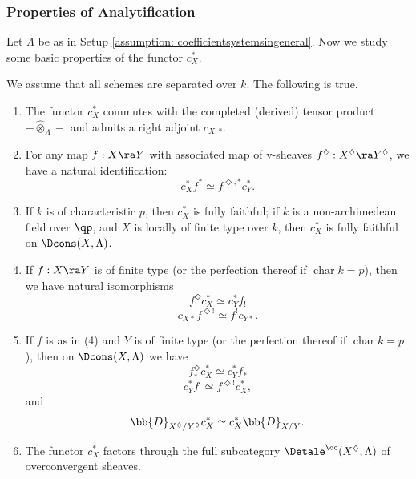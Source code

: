 \documentclass[letterpaper,11pt]{amsart}
\begin{document}
\subsubsection{Properties of Analytification}
Let $\Lambda$ be as in Setup \ref{assumption: coefficientsystemsingeneral}. Now we study some basic properties of the functor $c_X^\ast$. 

\begin{proposition}{\label{prop: propertiesofthealgebraizationfunctor}}
We assume that all schemes are separated over $k$. The following is true.
\begin{enumerate}
\item The functor $c_{X}^\ast$ commutes with the completed (derived) tensor product $-\hat{\otimes}_\Lambda-$ and admits a right adjoint $c_{X,\ast}$. 
\item For any map $f: X \ra Y$ with associated map of v-sheaves $f^{\Diamond}: X^{\Diamond} \ra Y^{\Diamond}$, we have a natural identification:
\[ c_{X}^\ast f^\ast \simeq f^{\Diamond,\ast}c_{Y}^\ast.\]
\item If $k$ is of characteristic $p$, then $c_X^\ast$ is fully faithful; if $k$ is a non-archimedean field over $\qp$, and $X$ is locally of finite type over $k$, then $c_X^\ast$ is fully faithful on $\Dcons(X,\Lambda)$.
\item If $f:X \ra Y$ is of finite type (or the perfection thereof if $\operatorname{char}k=p$), then we have natural isomorphisms
\[ f^{\Diamond}_{!}c_{X}^\ast \simeq c_{Y}^\ast f_{!}\]
\[ c_{X\ast} f^{\Diamond!}  \simeq f^{!}c_{Y\ast}.\]
\item If $f$ is as in (4) and $Y$ is of finite type (or the perfection thereof if $\operatorname{char}k = p$), then on $\Dcons(X,\Lambda)$ we have
\[ f^{\Diamond}_\ast c_{X}^\ast \simeq c_{Y}^\ast f_\ast\]
\[ c_{Y}^{*}f^{!}\simeq f^{\Diamond!}c_{X}^{*}, \]
and
\[ \bb{D}_{X^{\Diamond}/Y^\Diamond}c_{X}^{*} \simeq c_{X}^{*}\bb{D}_{X/Y}. \]
\item The functor $c_{X}^\ast$ factors through the full subcategory $\Detale^{\oc}(X^{\Diamond},\Lambda)$ of overconvergent sheaves. 
\end{enumerate}
\end{proposition}
\end{document}
